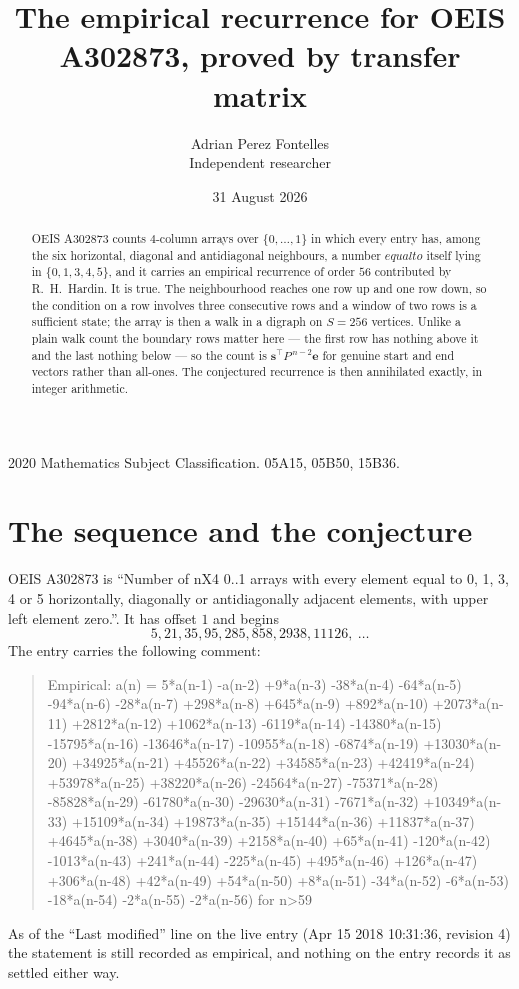 \documentclass[11pt,a4paper]{article}
\title{The empirical recurrence for OEIS A302873, proved by transfer matrix}
\author{Adrian Perez Fontelles\\ \small Independent researcher}
\date{31 August 2026}
\theoremstyle{plain}
\theoremstyle{definition}
\begin{document}
\maketitle

\begin{abstract}
OEIS A302873 counts $4$-column arrays over $\{0,\dots,1\}$ in which every entry has,
among the six horizontal, diagonal and antidiagonal neighbours, a number $equal to$ itself lying in $\{0,1,3,4,5\}$, and it carries an empirical
recurrence of order $56$ contributed by R.~H.~Hardin. It is true. The neighbourhood
reaches one row up and one row down, so the condition on a row involves three consecutive
rows and a window of two rows is a sufficient state; the array is then a walk in a digraph
on $S=256$ vertices. Unlike a plain walk count the boundary rows matter here --- the first
row has nothing above it and the last nothing below --- so the count is
$\mathbf{s}^{\!\top}P^{\,n-2}\mathbf{e}$ for genuine start and end vectors rather than
all-ones. The conjectured recurrence is then annihilated exactly, in integer arithmetic.
\end{abstract}

\noindent\small 2020 Mathematics Subject Classification. 05A15, 05B50, 15B36.\normalsize

\section{The sequence and the conjecture}

OEIS A302873 is ``Number of nX4 0..1 arrays with every element equal to 0, 1, 3, 4 or 5 horizontally, diagonally or antidiagonally adjacent elements, with upper left element zero.''. It has offset
$1$ and begins
\[
5, 21, 35, 95, 285, 858, 2938, 11126,\ \dots
\]
The entry carries the following comment:
\begin{quote}\small
Empirical: a(n) = 5*a(n-1) -a(n-2) +9*a(n-3) -38*a(n-4) -64*a(n-5) -94*a(n-6) -28*a(n-7) +298*a(n-8) +645*a(n-9) +892*a(n-10) +2073*a(n-11) +2812*a(n-12) +1062*a(n-13) -6119*a(n-14) -14380*a(n-15) -15795*a(n-16) -13646*a(n-17) -10955*a(n-18) -6874*a(n-19) +13030*a(n-20) +34925*a(n-21) +45526*a(n-22) +34585*a(n-23) +42419*a(n-24) +53978*a(n-25) +38220*a(n-26) -24564*a(n-27) -75371*a(n-28) -85828*a(n-29) -61780*a(n-30) -29630*a(n-31) -7671*a(n-32) +10349*a(n-33) +15109*a(n-34) +19873*a(n-35) +15144*a(n-36) +11837*a(n-37) +4645*a(n-38) +3040*a(n-39) +2158*a(n-40) +65*a(n-41) -120*a(n-42) -1013*a(n-43) +241*a(n-44) -225*a(n-45) +495*a(n-46) +126*a(n-47) +306*a(n-48) +42*a(n-49) +54*a(n-50) +8*a(n-51) -34*a(n-52) -6*a(n-53) -18*a(n-54) -2*a(n-55) -2*a(n-56) for n>59
\end{quote}
As of the ``Last modified'' line on the live entry (Apr 15 2018 10:31:36, revision
4) the statement is still recorded as empirical, and nothing on the entry
records it as settled either way.
\end{document}
